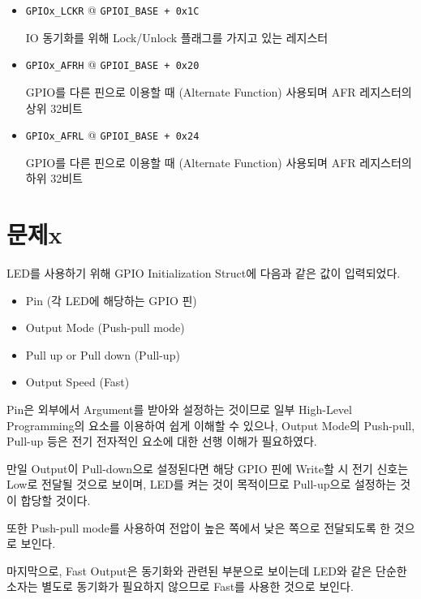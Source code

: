 \documentclass{article}
\begin{document}
\begin{mdframed}
\begin{itemize}
            \item \texttt{GPIOx\_LCKR} @ \texttt{GPIOI\_BASE + 0x1C}
            
            IO 동기화를 위해 Lock/Unlock 플래그를 가지고 있는 레지스터

            \item \texttt{GPIOx\_AFRH} @ \texttt{GPIOI\_BASE + 0x20}
            
            GPIO를 다른 핀으로 이용할 때 (Alternate Function) 사용되며 AFR 레지스터의 상위 32비트

            \item \texttt{GPIOx\_AFRL} @ \texttt{GPIOI\_BASE + 0x24}
            
            GPIO를 다른 핀으로 이용할 때 (Alternate Function) 사용되며 AFR 레지스터의 하위 32비트
        \end{itemize}
        
    \end{mdframed}

    \section*{문제x \normalsize{}}

    \begin{mdframed}
        LED를 사용하기 위해 GPIO Initialization Struct에 다음과 같은 값이 입력되었다.
        
        \begin{itemize}
            \item Pin (각 LED에 해당하는 GPIO 핀)
            \item Output Mode (Push-pull mode)
            \item Pull up or Pull down (Pull-up)
            \item Output Speed (Fast)
        \end{itemize}

        Pin은 외부에서 Argument를 받아와 설정하는 것이므로 일부 High-Level Programming의 
        요소를 이용하여 쉽게 이해할 수 있으나, Output Mode의 Push-pull, Pull-up 등은 전기
        전자적인 요소에 대한 선행 이해가 필요하였다. 

        만일 Output이 Pull-down으로 설정된다면 해당 GPIO 핀에 Write할 시 전기 신호는 Low로
        전달될 것으로 보이며, LED를 켜는 것이 목적이므로 Pull-up으로 설정하는 것이 합당할 것이다.

        또한 Push-pull mode를 사용하여 전압이 높은 쪽에서 낮은 쪽으로 전달되도록 한 것으로 보인다.

        마지막으로, Fast Output은 동기화와 관련된 부분으로 보이는데 LED와 같은 단순한 소자는
        별도로 동기화가 필요하지 않으므로 Fast를 사용한 것으로 보인다.
    \end{mdframed}
\end{document}
